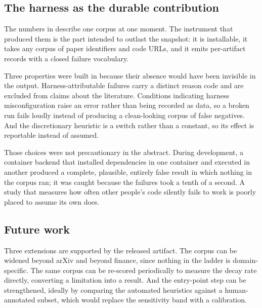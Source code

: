 \subsection{The harness as the durable contribution}\label{sec:harness_contribution}

The numbers in  describe one corpus at one moment. The
instrument that produced them is the part intended to outlast the snapshot: it is
installable, it takes any corpus of paper identifiers and code URLs, and it emits
per-artifact records with a closed failure vocabulary.

Three properties were built in because their absence would have been invisible in
the output. Harness-attributable failures carry a distinct reason code and are
excluded from claims about the literature. Conditions indicating harness
misconfiguration raise an error rather than being recorded as data, so a broken
run fails loudly instead of producing a clean-looking corpus of false negatives.
And the discretionary heuristic is a switch rather than a constant, so its effect
is reportable instead of assumed.

Those choices were not precautionary in the abstract. During development, a
container backend that installed dependencies in one container and executed in
another produced a complete, plausible, entirely false result in which nothing in
the corpus ran; it was caught because the failures took a tenth of a second. A
study that measures how often other people's code silently fails to work is
poorly placed to assume its own does.

\subsection{Future work}\label{sec:future}

Three extensions are supported by the released artifact. The corpus can be widened
beyond arXiv and beyond finance, since nothing in the ladder is domain-specific.
The same corpus can be re-scored periodically to measure the decay rate directly,
converting a limitation into a result. And the entry-point step can be
strengthened, ideally by comparing the automated heuristics against a
human-annotated subset, which would replace the sensitivity band with a
calibration.

